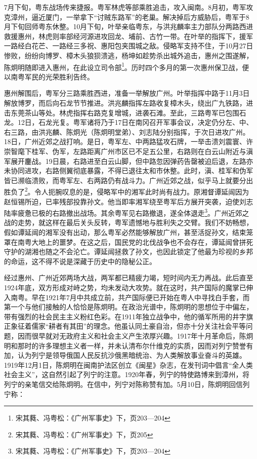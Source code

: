 7月下旬，粤东战场传来捷报。粤军林虎等部乘胜追击，攻入闽南。8月初，粤军攻克漳州，逼近厦门，一举拿下“讨贼东路军”的老巢。解决掉后方威胁后，粤军于8月下旬回师粤东休整。10月下旬，叶举亲临粤东，与洪兆麟率主力部队分两路西进救援惠州，林虎则率部经河源进攻回龙、埔前、古竹一带。在叶举的指挥下，援军一路经白花芒、一路经三多祝、惠阳包夹围城之敌。侵略军支持不住，于10月27日惨败，纷纷向博罗、樟木头狼狈溃逃，杨坤如趁势杀出城外追击，惠州之围遂解，陈炯明随即进入惠州，在此设立司令部\footnote{宋其蕤、冯粤松：《广州军事史》下，页203—204}。历时四个多月的第一次惠州保卫战，便以南粤军民的光荣胜利告终。

惠州解围后，粤军分三路乘胜西进，准备一举解放广州。叶举指挥中路于11月3日解放博罗，而后向石龙节节推进。洪兆麟指挥左路收复樟木头，绕出广九铁路，进击东莞茶山等处。林虎指挥右路克复增城，进袭石滩。至此，三路粤军已包围石龙。12日，石龙光复。粤军诸将乃于17日在南冈召开军事会议，决定仍分左、中、右三路，由洪兆麟、陈炯光（陈炯明堂弟）、刘志陆分别指挥，于次日进攻广州。18日，广州近郊之战打响。是日，粤军左、中两路猛攻石牌，一举击溃刘震寰、许崇智麾下桂军、伪军，左路距离广州市区已不足五公里，右路则在白云山附近与滇军展开鏖战。19日晨，右路进至白云山脚，但中路忽因弹药告罄被迫后退，左路亦未协同进攻，右路侧翼彻底暴露，不得已退往太和市休整。此时，滇、桂军和伪军皆已濒临溃败，而粤军左、右两路仍有战斗力。广州近郊之战，似乎马上就要分出胜负了\footnote{宋其蕤、冯粤松：《广州军事史》下，页205}。令人扼腕叹息的是，侵略军中的湘军此时尚有战力。原湘督谭延闿因为赵恒锡所迫，已率残部投靠孙文。他当即率湘军绕至粤军后方展开突袭，迫使刘志陆率疲惫已极的右路撤出战场。其余粤军见右路撤退，遂全体退走\footnote{宋其蕤、冯粤松：《广州军事史》下，页203—204}。广州近郊之战的走势，就这样在最后关头反转，粤军遗憾地与胜利失之交臂。我们不妨畅想，假如谭延闿的湘军没有出动，那么粤军必然能够解放广州，甚至活捉孙文，结束笼罩在南粤大地上的噩梦。在这之后，国民党的北伐战争也不会存在，谭延闿曾拼死守护的湖湘也随之不会沦亡。谭延闿拯救了孙文，也因此锁定了他最为珍视的乡邦的命运，这不得不说是深藏于历史中的隐秘公正。

经过惠州、广州近郊两场大战，两军都已精疲力竭，短时间内无力再战。此后直至1924年底，双方形成对峙之势，均未发动大攻势。就在这时，共产国际的魔掌已伸入南粤。早在1921年7月中共成立前，共产国际便已开始在粤人中寻找白手套，而第一个与他们接触的人恰恰是陈炯明。在政治光谱中，陈炯明的思想位于中偏左，带有强烈的社会民主主义粉红色彩。在1911年独立战争中，他的循军所用的井字旗正象征着儒家“耕者有其田”的理念。他虽认同土豪自治，但亦十分关注社会平等问题，因而很早就对无政府主义和社会主义产生浓厚兴趣。1917年十月革命后，陈炯明和那时的许多理想主义者一样，并未认清布尔什维克的实质，因而对列宁赞誉有加，认为列宁是领导俄国人民反抗沙俄黑暗统治、为人类解放事业奋斗的英雄。1919年12月1日，陈炯明在闽南护法区创立《闽星》杂志，在发刊词中倡言“全人类社会主义”，这自然引起了列宁的注意。1920年春，列宁的特使路博来到漳州，将列宁的亲笔信交给陈炯明。在信中，列宁对陈称赞有加。5月10日，陈炯明回信列宁称：


